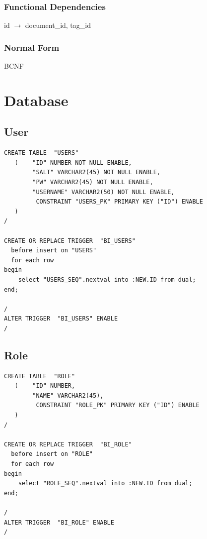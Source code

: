 \documentclass[11pt]{article}
\begin{document}
\subsubsection{Functional Dependencies}
\label{sec-3-11-2}

    
    id $\rightarrow$ document\_id, tag\_id
\subsubsection{Normal Form}
\label{sec-3-11-3}


    BCNF
    
\section{Database}
\label{sec-4}

  
\subsection{User}
\label{sec-4-1}



\begin{verbatim}
CREATE TABLE  "USERS" 
   (    "ID" NUMBER NOT NULL ENABLE, 
        "SALT" VARCHAR2(45) NOT NULL ENABLE, 
        "PW" VARCHAR2(45) NOT NULL ENABLE, 
        "USERNAME" VARCHAR2(50) NOT NULL ENABLE, 
         CONSTRAINT "USERS_PK" PRIMARY KEY ("ID") ENABLE
   )
/

CREATE OR REPLACE TRIGGER  "BI_USERS" 
  before insert on "USERS"               
  for each row  
begin   
    select "USERS_SEQ".nextval into :NEW.ID from dual; 
end; 

/
ALTER TRIGGER  "BI_USERS" ENABLE
/
\end{verbatim}
\subsection{Role}
\label{sec-4-2}



\begin{verbatim}
CREATE TABLE  "ROLE" 
   (    "ID" NUMBER, 
        "NAME" VARCHAR2(45), 
         CONSTRAINT "ROLE_PK" PRIMARY KEY ("ID") ENABLE
   )
/

CREATE OR REPLACE TRIGGER  "BI_ROLE" 
  before insert on "ROLE"               
  for each row  
begin   
    select "ROLE_SEQ".nextval into :NEW.ID from dual; 
end; 

/
ALTER TRIGGER  "BI_ROLE" ENABLE
/
\end{verbatim}
\end{document}
